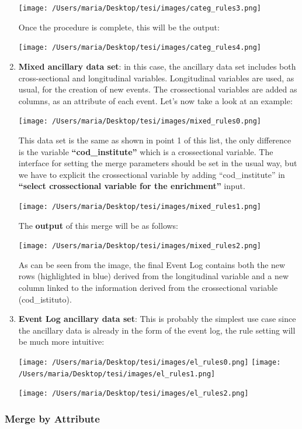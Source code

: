\documentclass[
]{book}
\begin{document}
\begin{enumerate}
  \texttt{[image: /Users/maria/Desktop/tesi/images/categ\_rules3.png]}

  Once the procedure is complete, this will be the output:

  \texttt{[image: /Users/maria/Desktop/tesi/images/categ\_rules4.png]}
\item
  \textbf{Mixed ancillary data set}: in this case, the ancillary data set includes both cross-sectional and longitudinal variables. Longitudinal variables are used, as usual, for the creation of new events.
  The crossectional variables are added as columns, as an attribute of each event.
  Let's now take a look at an example:

  \texttt{[image: /Users/maria/Desktop/tesi/images/mixed\_rules0.png]}

  This data set is the same as shown in point 1 of this list, the only difference is the variable \textbf{``cod\_institute''} which is a crossectional variable.
  The interface for setting the merge parameters should be set in the usual way, but we have to explicit the crossectional variable by adding ``cod\_institute'' in \textbf{``select crossectional variable for the enrichment''} input.

  \texttt{[image: /Users/maria/Desktop/tesi/images/mixed\_rules1.png]}

  The \textbf{output} of this merge will be as follows:

  \texttt{[image: /Users/maria/Desktop/tesi/images/mixed\_rules2.png]}

  As can be seen from the image, the final Event Log contains both the new rows (highlighted in blue) derived from the longitudinal variable and a new column linked to the information derived from the crossectional variable (cod\_istituto).
\item
  \textbf{Event Log ancillary data set}: This is probably the simplest use case since the ancillary data is already in the form of the event log, the rule setting will be much more intuitive:

  \texttt{[image: /Users/maria/Desktop/tesi/images/el\_rules0.png]}
  \texttt{[image: /Users/maria/Desktop/tesi/images/el\_rules1.png]}

  \texttt{[image: /Users/maria/Desktop/tesi/images/el\_rules2.png]}
\end{enumerate}

\hypertarget{merge-by-attribute}{%
\subsubsection{Merge by Attribute}\label{merge-by-attribute}}
\end{document}
